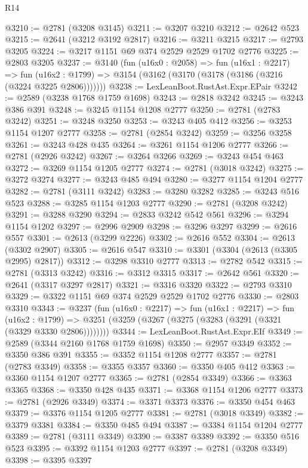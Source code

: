 \begin{lexlean}{R14}
\begin{coremodule}
@3210 := @2781 (@3208 @3145)
@3211 := @3207 @3210
@3212 := @2642 @523
@3215 := @2641 (@3212 @3192 @2817)
@3216 := @3211 @3215
@3217 := @2793 @3205
@3224 := @3217 @1151 @69 @374 @2529 @2529 @1702 @2776
@3225 := @2803 @3205
@3237 := @3140
    (fun (u16x0 : @2058) =>
    fun (u16x1 : @2217) =>
    fun (u16x2 : @1799) => @3154 (@3162 (@3170 (@3178 (@3186 (@3216 (@3224 @3225 @2806)))))))
@3238 := LexLeanBoot.RustAst.Expr.EPair
@3242 := @2589 (@3238 @1768 @1759 @1698)
@3243 := @2818 @3242
@3245 := @3243 @386 @391
@3248 := @3245 @1154 @1208 @2777
@3250 := @2781 (@2783 @3242)
@3251 := @3248 @3250
@3253 := @3243 @405 @412
@3256 := @3253 @1154 @1207 @2777
@3258 := @2781 (@2854 @3242)
@3259 := @3256 @3258
@3261 := @3243 @428 @435
@3264 := @3261 @1154 @1206 @2777
@3266 := @2781 (@2926 @3242)
@3267 := @3264 @3266
@3269 := @3243 @454 @463
@3272 := @3269 @1154 @1205 @2777
@3274 := @2781 (@3018 @3242)
@3275 := @3272 @3274
@3277 := @3243 @485 @494
@3280 := @3277 @1154 @1204 @2777
@3282 := @2781 (@3111 @3242)
@3283 := @3280 @3282
@3285 := @3243 @516 @523
@3288 := @3285 @1154 @1203 @2777
@3290 := @2781 (@3208 @3242)
@3291 := @3288 @3290
@3294 := @2833 @3242 @542 @561
@3296 := @3294 @1154 @1202
@3297 := @2996 @2909
@3298 := @3296 @3297
@3299 := @2616 @557
@3301 := @2613 (@3299 @2226)
@3302 := @2616 @552
@3304 := @2613 (@3302 @2907)
@3305 := @2616 @547
@3310 := @3301 (@3304 (@2613 (@3305 @2995) @2817))
@3312 := @3298 @3310 @2777
@3313 := @2782 @542
@3315 := @2781 (@3313 @3242)
@3316 := @3312 @3315
@3317 := @2642 @561
@3320 := @2641 (@3317 @3297 @2817)
@3321 := @3316 @3320
@3322 := @2793 @3310
@3329 := @3322 @1151 @69 @374 @2529 @2529 @1702 @2776
@3330 := @2803 @3310
@3343 := @3237
    (fun (u16x0 : @2217) =>
    fun (u16x1 : @2217) =>
    fun (u16x2 : @1799) =>
    @3251 (@3259 (@3267 (@3275 (@3283 (@3291 (@3321 (@3329 @3330 @2806))))))))
@3344 := LexLeanBoot.RustAst.Expr.EIf
@3349 := @2589 (@3344 @2160 @1768 @1759 @1698)
@3350 := @2957 @3349
@3352 := @3350 @386 @391
@3355 := @3352 @1154 @1208 @2777
@3357 := @2781 (@2783 @3349)
@3358 := @3355 @3357
@3360 := @3350 @405 @412
@3363 := @3360 @1154 @1207 @2777
@3365 := @2781 (@2854 @3349)
@3366 := @3363 @3365
@3368 := @3350 @428 @435
@3371 := @3368 @1154 @1206 @2777
@3373 := @2781 (@2926 @3349)
@3374 := @3371 @3373
@3376 := @3350 @454 @463
@3379 := @3376 @1154 @1205 @2777
@3381 := @2781 (@3018 @3349)
@3382 := @3379 @3381
@3384 := @3350 @485 @494
@3387 := @3384 @1154 @1204 @2777
@3389 := @2781 (@3111 @3349)
@3390 := @3387 @3389
@3392 := @3350 @516 @523
@3395 := @3392 @1154 @1203 @2777
@3397 := @2781 (@3208 @3349)
@3398 := @3395 @3397

\end{coremodule}
\end{lexlean}
